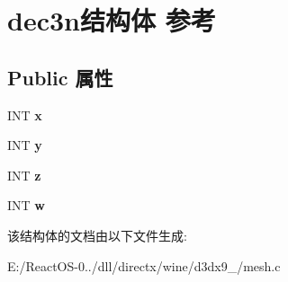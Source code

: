 \hypertarget{structdec3n}{}\section{dec3n结构体 参考}
\label{structdec3n}
\subsection*{Public 属性}
\begin{DoxyCompactItemize}
\item 
\mbox{\label{structdec3n_afb89a19666d00dcdc179d6ff12ecfabf}} 
I\+NT {\bfseries x}
\item 
\mbox{\label{structdec3n_a19d92b57070771f456a063d61114d8a3}} 
I\+NT {\bfseries y}
\item 
\mbox{\label{structdec3n_aa249b09e3685a9f365dc5614abc794f8}} 
I\+NT {\bfseries z}
\item 
\mbox{\label{structdec3n_a1503267abe0434ac8cc2ded9c488715f}} 
I\+NT {\bfseries w}
\end{DoxyCompactItemize}


该结构体的文档由以下文件生成\+:\begin{DoxyCompactItemize}
\item 
E\+:/\+React\+O\+S-\/0../dll/directx/wine/d3dx9\+\_/mesh.\+c\end{DoxyCompactItemize}
